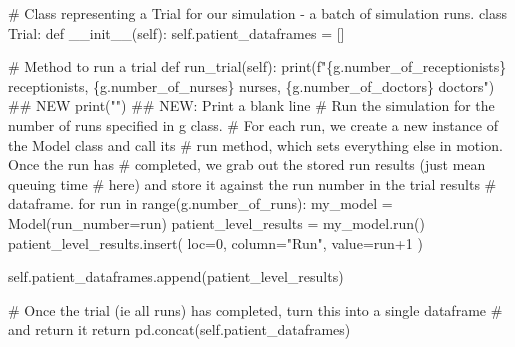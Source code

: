 \documentclass[
  letterpaper,
  DIV=11,
  numbers=noendperiod]{scrreprt}
\newenvironment{Shaded}{}{}
\newcommand{\BuiltInTok}[1]{\textcolor[rgb]{0.84,0.23,0.29}{#1}}
\newcommand{\CommentTok}[1]{\textcolor[rgb]{0.42,0.45,0.49}{#1}}
\newcommand{\ControlFlowTok}[1]{\textcolor[rgb]{0.84,0.23,0.29}{#1}}
\newcommand{\DecValTok}[1]{\textcolor[rgb]{0.00,0.36,0.77}{#1}}
\newcommand{\FunctionTok}[1]{\textcolor[rgb]{0.44,0.26,0.76}{#1}}
\newcommand{\KeywordTok}[1]{\textcolor[rgb]{0.84,0.23,0.29}{#1}}
\newcommand{\NormalTok}[1]{\textcolor[rgb]{0.14,0.16,0.18}{#1}}
\newcommand{\OperatorTok}[1]{\textcolor[rgb]{0.14,0.16,0.18}{#1}}
\newcommand{\SpecialCharTok}[1]{\textcolor[rgb]{0.00,0.36,0.77}{#1}}
\newcommand{\SpecialStringTok}[1]{\textcolor[rgb]{0.01,0.18,0.38}{#1}}
\newcommand{\StringTok}[1]{\textcolor[rgb]{0.01,0.18,0.38}{#1}}
\newcommand{\VariableTok}[1]{\textcolor[rgb]{0.89,0.38,0.04}{#1}}
\begin{document}
\begin{Shaded}
\begin{Highlighting}[]
\CommentTok{\# Class representing a Trial for our simulation {-} a batch of simulation runs.}
\KeywordTok{class}\NormalTok{ Trial:}
    \KeywordTok{def}  \FunctionTok{\_\_init\_\_}\NormalTok{(}\VariableTok{self}\NormalTok{):}
        \VariableTok{self}\NormalTok{.patient\_dataframes }\OperatorTok{=}\NormalTok{ []}

    \CommentTok{\# Method to run a trial}
    \KeywordTok{def}\NormalTok{ run\_trial(}\VariableTok{self}\NormalTok{):}
        \BuiltInTok{print}\NormalTok{(}\SpecialStringTok{f"}\SpecialCharTok{\{}\NormalTok{g}\SpecialCharTok{.}\NormalTok{number\_of\_receptionists}\SpecialCharTok{\}}\SpecialStringTok{ receptionists, }\SpecialCharTok{\{}\NormalTok{g}\SpecialCharTok{.}\NormalTok{number\_of\_nurses}\SpecialCharTok{\}}\SpecialStringTok{ nurses, }\SpecialCharTok{\{}\NormalTok{g}\SpecialCharTok{.}\NormalTok{number\_of\_doctors}\SpecialCharTok{\}}\SpecialStringTok{ doctors"}\NormalTok{) }\CommentTok{\#\# NEW}
        \BuiltInTok{print}\NormalTok{(}\StringTok{""}\NormalTok{) }\CommentTok{\#\# NEW: Print a blank line}
        \CommentTok{\# Run the simulation for the number of runs specified in g class.}
        \CommentTok{\# For each run, we create a new instance of the Model class and call its}
        \CommentTok{\# run method, which sets everything else in motion.  Once the run has}
        \CommentTok{\# completed, we grab out the stored run results (just mean queuing time}
        \CommentTok{\# here) and store it against the run number in the trial results}
        \CommentTok{\# dataframe.}
        \ControlFlowTok{for}\NormalTok{ run }\KeywordTok{in} \BuiltInTok{range}\NormalTok{(g.number\_of\_runs):}
\NormalTok{            my\_model }\OperatorTok{=}\NormalTok{ Model(run\_number}\OperatorTok{=}\NormalTok{run)}
\NormalTok{            patient\_level\_results }\OperatorTok{=}\NormalTok{ my\_model.run()}
\NormalTok{            patient\_level\_results.insert(}
\NormalTok{                loc}\OperatorTok{=}\DecValTok{0}\NormalTok{,}
\NormalTok{                column}\OperatorTok{=}\StringTok{"Run"}\NormalTok{,}
\NormalTok{                value}\OperatorTok{=}\NormalTok{run}\OperatorTok{+}\DecValTok{1}
\NormalTok{                )}

            \VariableTok{self}\NormalTok{.patient\_dataframes.append(patient\_level\_results)}

        \CommentTok{\# Once the trial (ie all runs) has completed, turn this into a single dataframe}
        \CommentTok{\# and return it}
        \ControlFlowTok{return}\NormalTok{ pd.concat(}\VariableTok{self}\NormalTok{.patient\_dataframes)}
\end{Highlighting}
\end{Shaded}
\end{document}
